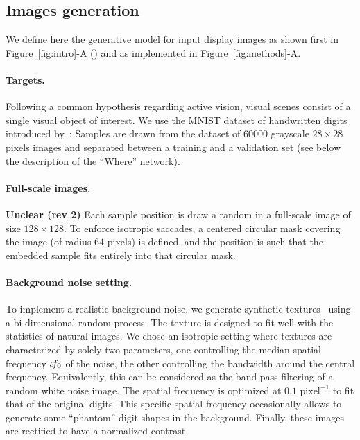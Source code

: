 \subsection*{Images generation}
We define here the generative model for input display images as shown first in Figure~\ref{fig:intro}-A (\DIS ) and as implemented in Figure~\ref{fig:methods}-A.

\paragraph{Targets.} Following a common hypothesis regarding active vision, visual scenes consist of a single visual object of interest. We use the MNIST dataset of handwritten digits introduced by~\cite{Lecun1998}: %
Samples are drawn from the dataset of $60000$ grayscale $28\times 28$ pixels images and separated between a training and a validation set (see below the description of the ``Where'' network).

\paragraph{Full-scale images.} 
{\color{red}\textbf{ Unclear (rev 2)}
Each sample position is draw a random in a full-scale image of size $128\times 128$. To enforce isotropic saccades, a centered circular mask covering the image (of radius $64$ pixels) is defined, and the position is such that the embedded sample fits entirely into that circular mask.}

\paragraph{Background noise setting.} To implement a realistic background noise, we generate synthetic textures~\cite{Sanz12} using a bi-dimensional random process. %
The texture is designed to fit well with the statistics of natural images. We chose an isotropic setting where textures are characterized by solely two parameters, one controlling the median spatial frequency $s\hspace{-2pt}f_0$ of the noise, the other controlling the bandwidth around the central frequency. Equivalently, this can be considered as the band-pass filtering of a random white noise image. The spatial frequency is optimized at $0.1\text{ pixel}^{-1}$ to fit that of the original digits. This specific spatial frequency occasionally allows to generate some ``phantom'' digit shapes in the background. Finally, these images are rectified to have a normalized contrast.

